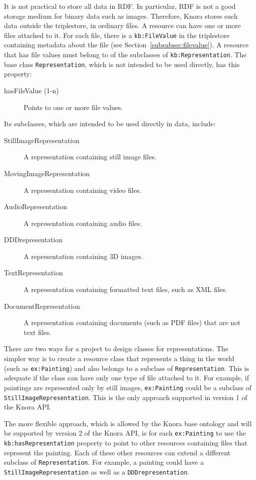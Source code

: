 \documentclass[12pt, a4paper]{article}
\begin{document}
\label{subsubsec:representations}

It is not practical to store all data in RDF. In particular, RDF is not a good storage medium for binary data such as images. Therefore, Knora stores such data outside the triplestore, in ordinary files. A resource can have one or more files attached to it. For each file, there is a \texttt{kb:FileValue} in the triplestore containing metadata about the file (see Section~\ref{subsubsec:filevalue}). A resource that has file values must belong to of the subclasses of \texttt{kb:Representation}. The base class \texttt{Representation}, which is not intended to be used directly, has this property:

\begin{description}
	\item[hasFileValue (1-n)] Points to one or more file values.
\end{description}

Its subclasses, which are intended to be used directly in data, include:

\begin{description}
	\item[StillImageRepresentation] A representation containing still image files.
	\item[MovingImageRepresentation] A representation containing video files.
	\item[AudioRepresentation] A representation containing audio files.
	\item[DDDrepresentation] A representation containing 3D images.
	\item[TextRepresentation] A representation containing formatted text files, such as XML files.
	\item[DocumentRepresentation] A representation containing documents (such as PDF files) that are not text files.
\end{description}

There are two ways for a project to design classes for representations. The simpler way is to create a resource class that represents a thing in the world (such as \texttt{ex:Painting}) and also belongs to a subclass of \texttt{Representation}. This is adequate if the class can have only one type of file attached to it. For example, if paintings are represented only by still images, \texttt{ex:Painting} could be a subclass of \texttt{Still\-Image\-Representation}. This is the only approach supported in version 1 of the Knora API.

The more flexible approach, which is allowed by the Knora base ontology and will be supported by version 2 of the Knora API, is for each \texttt{ex:Painting} to use the \texttt{kb:hasRepresentation} property to point to other resources containing files that represent the painting. Each of these other resources can extend a different subclass of \texttt{Representation}. For example, a painting could have a \texttt{Still\-Image\-Representation} as well as a \texttt{DDDrepresentation}.
\end{document}
